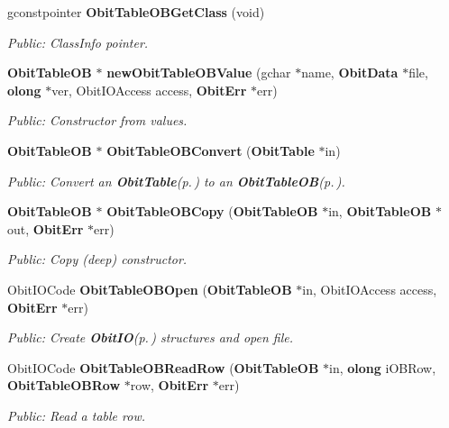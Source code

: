 \begin{CompactItemize}
gconstpointer {\bf Obit\-Table\-OBGet\-Class} (void)
\begin{CompactList}\small\item\em Public: Class\-Info pointer. \item\end{CompactList}\item 
{\bf Obit\-Table\-OB} $\ast$ {\bf new\-Obit\-Table\-OBValue} (gchar $\ast$name, {\bf Obit\-Data} $\ast$file, {\bf olong} $\ast$ver, Obit\-IOAccess access, {\bf Obit\-Err} $\ast$err)
\begin{CompactList}\small\item\em Public: Constructor from values. \item\end{CompactList}\item 
{\bf Obit\-Table\-OB} $\ast$ {\bf Obit\-Table\-OBConvert} ({\bf Obit\-Table} $\ast$in)
\begin{CompactList}\small\item\em Public: Convert an {\bf Obit\-Table}{\rm (p.\,\pageref{structObitTable})} to an {\bf Obit\-Table\-OB}{\rm (p.\,\pageref{structObitTableOB})}. \item\end{CompactList}\item 
{\bf Obit\-Table\-OB} $\ast$ {\bf Obit\-Table\-OBCopy} ({\bf Obit\-Table\-OB} $\ast$in, {\bf Obit\-Table\-OB} $\ast$out, {\bf Obit\-Err} $\ast$err)
\begin{CompactList}\small\item\em Public: Copy (deep) constructor. \item\end{CompactList}\item 
Obit\-IOCode {\bf Obit\-Table\-OBOpen} ({\bf Obit\-Table\-OB} $\ast$in, Obit\-IOAccess access, {\bf Obit\-Err} $\ast$err)
\begin{CompactList}\small\item\em Public: Create {\bf Obit\-IO}{\rm (p.\,\pageref{structObitIO})} structures and open file. \item\end{CompactList}\item 
Obit\-IOCode {\bf Obit\-Table\-OBRead\-Row} ({\bf Obit\-Table\-OB} $\ast$in, {\bf olong} i\-OBRow, {\bf Obit\-Table\-OBRow} $\ast$row, {\bf Obit\-Err} $\ast$err)
\begin{CompactList}\small\item\em Public: Read a table row. \item\end{CompactList}\item 

\end{CompactItemize}
